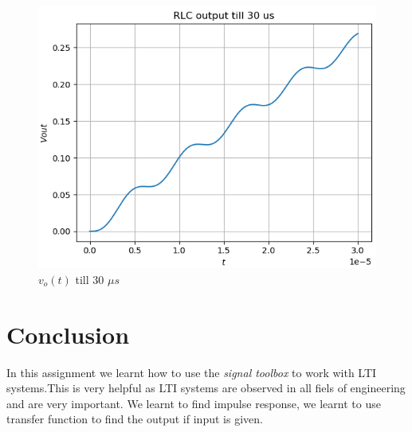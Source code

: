 \documentclass[11pt, a4paper]{article}
\begin{document}
    \begin{figure}[!h]
        \centering
        \includegraphics[scale = 0.7]{Figure 7.png}
        \caption{$v_o(t)$ till 30 $\mu s$}
        \label{fig:my_label}
    \end{figure}

\section{Conclusion}
In this assignment we learnt how to use the \textit{signal toolbox} to work with LTI systems.This is very helpful as LTI systems are observed in all fiels of engineering and are very important. We learnt to find impulse response, we learnt to use transfer function to find the output if input is given.
\end{document}
